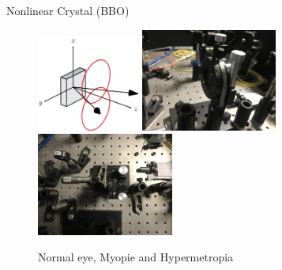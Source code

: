 \documentclass[xcolor=dvipsnames]{beamer}
\begin{document}
\begin{frame}{Nonlinear Crystal (BBO)}
\begin{figure}

{  \includegraphics[width=0.3\textwidth]{pictures/BBO.png} }
{  \includegraphics[width=0.4\textwidth]{pictures/BBOExp.jpg} }
{  \includegraphics[width=0.4\textwidth]{pictures/BBOExp2.jpg} }
\caption{Normal eye, Myopie and Hypermetropia}
 \label{n1}
 
\end{figure}
\end{frame}



\end{document}
